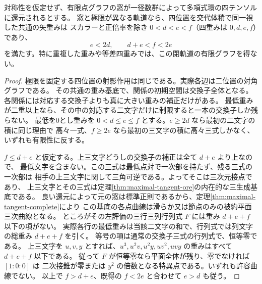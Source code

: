 \begin{proposition}\label{prop:finite-polynomial-limit-flag}
対称性を仮定せず、有限点グラフの窓が一径数群によって多項式環の四テンソルに還元されるとする。
窓と極限が異なる軌道なら、四位置を交代体積で同一視した共通の矢重みは
スカラーと正倍率を除き $0<d<e<f$（四重みは $0,d,e,f$）であり、
\[
                  e<2d,\qquad d+e<f<2e
\]
を満たす。特に重複した重みや等差四重みでは、この閉軌道の有限グラフを得ない。
\end{proposition}
\begin{proof}
極限を固定する四位置の射影作用は同じである。実際各辺は二位置の対角グラフである。
その共通の重み基底で、関係の初期空間は交換子全体となる。
各関係には対応する交換子よりも真に大きい重みの補正だけがある。
最低重みが二重以上なら、その中の対応する二文字だけに制限すると一本の交換子しか残らない。
最低を0とし重みを $0<d\le e\le f$ とする。$e\ge2d$ なら最初の二文字の積に同じ理由で
高々一式、$f\ge2e$ なら最初の三文字の積に高々三式しかなく、いずれも有限性に反する。

$f\le d+e$ と仮定する。上三文字どうしの交換子の補正は全て $d+e$ より上なので、
最低文字を含まない。この三式は最低点対で一次部を持たず、残る三式の一次部は
相手の上三文字に関して三角可逆である。よってそこは三次元接点であり、
上三文字とその三式は定理\ref{thm:maximal-tangent-ore}の内在的な三生成基底である。
良い還元によって元の窓は標準正則であるから、定理\ref{thm:maximal-tangent-complete}により
この基底の各点曲線は滑らか又は節点のみの被約平面三次曲線となる。
ところがその左評価の三行三列行列式 $F$ には重み $d+e+f$ 以下の項がない。
実際各行の最低重みは当該二文字の和で、行列式では列文字の総重み $d+e+f$ を引く。
等号の項は通常の交換子三式の行列式で、恒等零である。
上三文字を $u,v,y$ とすれば、$u^3,u^2v,u^2y,uv^2,uvy$ の重みはすべて $d+e+f$ 以下である。
従って $F$ が恒等零なら平面全体が残り、零でなければ $[1:0:0]$ は
二次接錐が零または $y^2$ の倍数となる特異点である。いずれも許容曲線でない。
以上で $f>d+e$、既得の $f<2e$ と合わせて $e>d$ も従う。
\end{proof}
